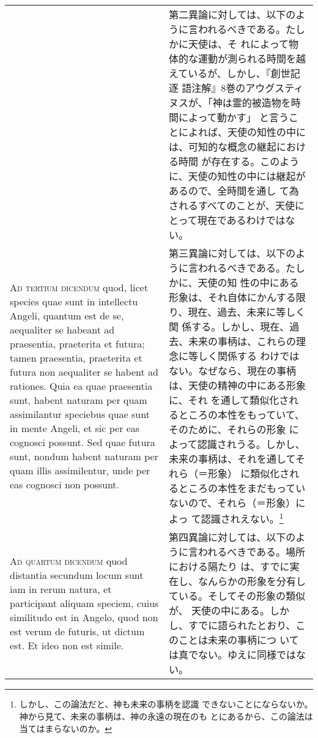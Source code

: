 \documentclass[10pt]{jsarticle} %
\begin{document}
\begin{longtable}{p{21em}p{21em}}
&

第二異論に対しては、以下のように言われるべきである。たしかに天使は、そ
れによって物体的な運動が測られる時間を越えているが、しかし、『創世記逐
語注解』8巻のアウグスティヌスが、「神は霊的被造物を時間によって動かす」
と言うことによれば、天使の知性の中には、可知的な概念の継起における時間
が存在する。このように、天使の知性の中には継起があるので、全時間を通し
て為されるすべてのことが、天使にとって現在であるわけではない。


\\


{\scshape Ad tertium dicendum} quod, licet species quae sunt in
intellectu Angeli, quantum est de se, aequaliter se habeant ad
praesentia, praeterita et futura; tamen praesentia, praeterita et
futura non aequaliter se habent ad rationes. Quia ea quae praesentia
sunt, habent naturam per quam assimilantur speciebus quae sunt in
mente Angeli, et sic per eas cognosci possunt. Sed quae futura sunt,
nondum habent naturam per quam illis assimilentur, unde per eas
cognosci non possunt.

&

第三異論に対しては、以下のように言われるべきである。たしかに、天使の知
性の中にある形象は、それ自体にかんする限り、現在、過去、未来に等しく関
係する。しかし、現在、過去、未来の事柄は、これらの理念に等しく関係する
わけではない。なぜなら、現在の事柄は、天使の精神の中にある形象に、それ
を通して類似化されるところの本性をもっていて、そのために、それらの形象
によって認識されうる。しかし、未来の事柄は、それを通してそれら（＝形象）
に類似化されるところの本性をまだもっていないので、それら（＝形象）によっ
て認識されえない。\footnote{しかし、この論法だと、神も未来の事柄を認識
できないことにならないか。神から見て、未来の事柄は、神の永遠の現在のも
とにあるから、この論法は当てはまらないのか。}

\\


{\scshape Ad quartum dicendum} quod distantia secundum locum sunt iam
in rerum natura, et participant aliquam speciem, cuius similitudo est
in Angelo, quod non est verum de futuris, ut dictum est. Et ideo non
est simile.

&


第四異論に対しては、以下のように言われるべきである。場所における隔たり
は、すでに実在し、なんらかの形象を分有している。そしてその形象の類似が、
天使の中にある。しかし、すでに語られたとおり、このことは未来の事柄につ
いては真でない。ゆえに同様ではない。

\end{longtable}
\newpage
\end{document}
